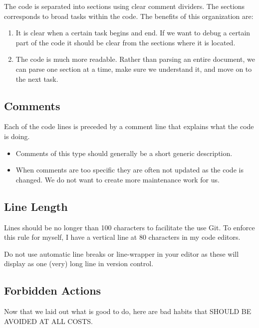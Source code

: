  The code is separated into sections using clear comment dividers. The sections corresponds to broad tasks within the code. The benefits of this organization are:
\begin{enumerate}
	\item It is clear when a certain task begins and end. If we want to debug a certain part of the code it should be clear from the sections where it is located.
	\item The code is much more readable. Rather than parsing an entire document, we can parse one section at a time, make sure we understand it, and move on to the next task.
\end{enumerate}

\subsection{Comments}

Each of the code lines is preceded by a comment line that explains what the code is doing.
\begin{itemize}
	\item Comments of this type should generally be a short generic description.
	\item When comments are too specific they are often not updated as the code is changed. We do not want to create more maintenance work for us.
\end{itemize}

\subsection{Line Length}

Lines should be no longer than 100 characters to facilitate the use Git. To enforce this rule for myself, I have a vertical line at 80 characters in my code editors.

Do not use automatic line breaks or line-wrapper in your editor as these will display as one (very) long line in version control.

\subsection{Forbidden Actions}

Now that we laid out what is good to do, here are bad habits that SHOULD BE AVOIDED AT ALL COSTS.

